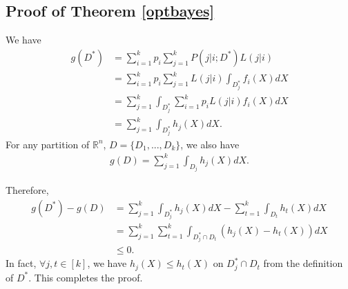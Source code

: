 \documentclass[english]{article}
\newenvironment{eqt}{\begin{equation}\begin{aligned}}{\end{aligned}\end{equation}}
\begin{document}
\newpage
\begin{appendix}
\section{Proof of Theorem \ref{optbayes}}
\par

We have
\begin{eqt}
g(D^*) & = \sum_{i=1}^kp_i\sum_{j=1}^kP(j|i;D^*)L(j|i) \\
& = \sum_{i=1}^kp_i\sum_{j=1}^kL(j|i)\int_{D_j^*}f_i(X)dX \\
& = \sum_{j=1}^k\int_{D_j^*}\sum_{i=1}^kp_iL(j|i)f_i(X)dX \\
& = \sum_{j=1}^k\int_{D_j^*}h_j(X)dX.
\end{eqt}
For any partition of $\mathbb{R}^n$, $D = \{D_1, ..., D_k\}$, we also have
\begin{eqt}
g(D) = \sum_{j=1}^k\int_{D_j}h_j(X)dX.
\end{eqt}

Therefore, 
\begin{eqt}
g(D^*) - g(D) & = \sum_{j=1}^k\int_{D_j^*}h_j(X)dX - \sum_{t=1}^k\int_{D_t}h_t(X)dX \\
& = \sum_{j=1}^k\sum_{t=1}^k\int_{D_j^*\cap D_t}\left(h_j(X)-h_t(X)\right)dX \\
& \leqslant 0.
\end{eqt}
In fact, $\forall j, t\in[k]$, we have $h_j(X)\leqslant h_t(X)$ on $D_j^*\cap D_t$ from the definition of $D^*$. This completes the proof.
\end{appendix}
\end{document}
